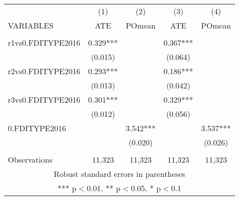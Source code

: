 \documentclass[]{article}
\begin{document}
\begin{tabular}{lcccc} \hline
 & (1) & (2) & (3) & (4) \\
VARIABLES & ATE & POmean & ATE & POmean \\ \hline
 &  &  &  &  \\
r1vs0.FDITYPE2016 & 0.329*** &  & 0.367*** &  \\
 & (0.015) &  & (0.064) &  \\
r2vs0.FDITYPE2016 & 0.293*** &  & 0.186*** &  \\
 & (0.013) &  & (0.042) &  \\
r3vs0.FDITYPE2016 & 0.301*** &  & 0.329*** &  \\
 & (0.012) &  & (0.056) &  \\
0.FDITYPE2016 &  & 3.542*** &  & 3.537*** \\
 &  & (0.020) &  & (0.026) \\
 &  &  &  &  \\
 Observations & 11,323 & 11,323 & 11,323 & 11,323 \\ \hline
\multicolumn{5}{c}{ Robust standard errors in parentheses} \\
\multicolumn{5}{c}{ *** p$<$0.01, ** p$<$0.05, * p$<$0.1} \\
\end{tabular}
\end{document}

